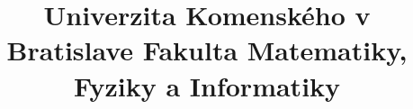 \documentclass[12pt,a4paper]{bachelor}
\title{Univerzita Komenského v Bratislave Fakulta Matematiky, Fyziky a Informatiky}
\author{\autor}
\begin{document}



\tableofcontents
\newpage



\label{totalpages}
\end{document}
